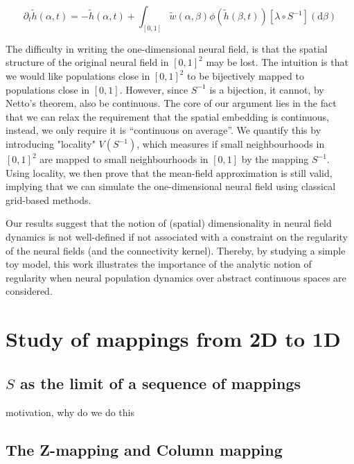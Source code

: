 \documentclass[NETN,manuscript]{stjour-new}
\def\d{\mathrm d}
\begin{document}
\begin{equation} \label{eq:nf-in-01}
\partial_t \tilde h(\alpha, t) = -\tilde h(\alpha, t) + \int_{[0,1]} \tilde w(\alpha, \beta) \phi(\tilde h(\beta, t)) \left[\lambda \circ S^{-1}\right](\d \beta)
\end{equation}

The difficulty in writing the one-dimensional neural field, is that the spatial structure of the original neural field in $[0,1]^2$ may be lost. The intuition is that we would like populations close in $[0,1]^2$ to be bijectively mapped to populations close in $[0,1]$. However, since $S^{-1}$ is a bijection, it cannot, by Netto's theorem, also be continuous. The core of our argument lies in the fact that we can relax the requirement that the spatial embedding is continuous, instead, we only require it is ``continuous on average''. We quantify this by introducing "locality" $V(S^{-1})$, which measures if small neighbourhoods in $[0,1]^2$ are mapped to small neighbourhoods in $[0,1]$ by the mapping $S^{-1}$. Using locality, we then prove that the mean-field approximation is still valid, implying that we can simulate the one-dimensional neural field using classical grid-based methods.




Our results suggest that the notion of (spatial) dimensionality in neural field dynamics is not well-defined if not associated with a constraint on the regularity of the neural fields (and the connectivity kernel). Thereby, by studying a simple toy model, this work illustrates the importance of the analytic notion of regularity when neural population dynamics over abstract continuous spaces are considered. 

\section{Study of mappings from 2D to 1D}

\subsection{$S$ as the limit of a sequence of mappings}

motivation, why do we do this

\subsection{The Z-mapping and Column mapping}
\end{document}
